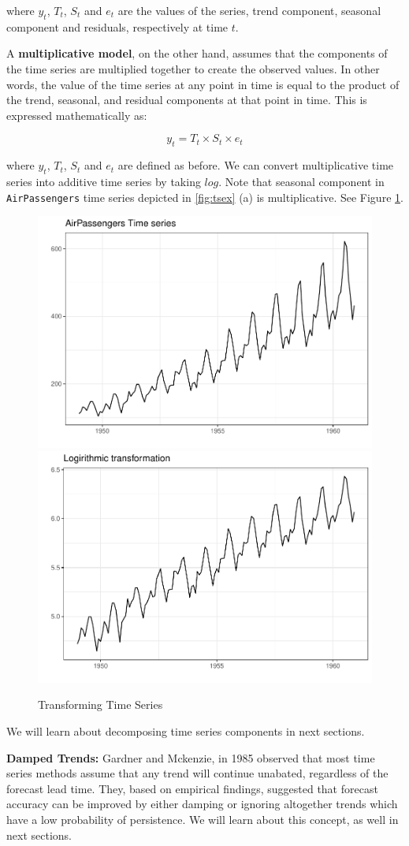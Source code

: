 \documentclass[
]{book}
\begin{document}
where \(y_t\), \(T_t\), \(S_t\) and \(e_t\) are the values of the series, trend component, seasonal component and residuals, respectively at time \(t\).

A \textbf{multiplicative model}, on the other hand, assumes that the components of the time series are multiplied together to create the observed values. In other words, the value of the time series at any point in time is equal to the product of the trend, seasonal, and residual components at that point in time. This is expressed mathematically as:

\[
y_t = T_t \times S_t \times e_t
\]

where \(y_t\), \(T_t\), \(S_t\) and \(e_t\) are defined as before. We can convert multiplicative time series into additive time series by taking \(log\). Note that seasonal component in \texttt{AirPassengers} time series depicted in \ref{fig:tsex} (a) is multiplicative. See Figure \ref{fig:logts}.

\begin{figure}

{\centering \includegraphics[width=0.49\linewidth]{DauR_files/figure-latex/logts-1} \includegraphics[width=0.49\linewidth]{DauR_files/figure-latex/logts-2} 

}

\caption{Transforming Time Series}\label{fig:logts}
\end{figure}

We will learn about decomposing time series components in next sections.

\textbf{Damped Trends:} Gardner and Mckenzie, in 1985 \citep{mcke} observed that most time series methods assume that any trend will continue unabated, regardless of the forecast lead time. They, based on empirical findings, suggested that forecast accuracy can be improved by either damping or ignoring altogether trends which have a low probability of persistence. We will learn about this concept, as well in next sections.
\end{document}
